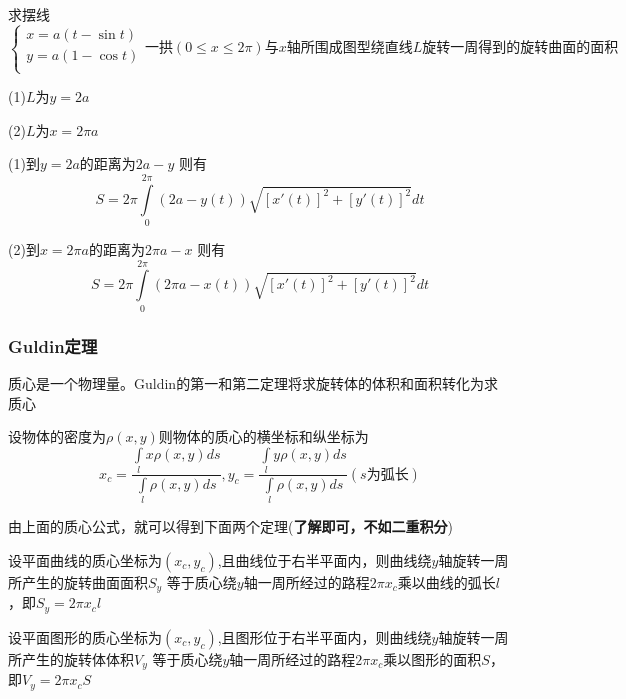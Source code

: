 \documentclass[lang=cn,10pt]{elegantbook}
\begin{document}
\begin{example}
	求摆线$\begin{cases}
		x=a\left( t-\sin t \right)\\
		y=a\left( 1-\cos t \right)\\
	\end{cases}\text{一拱}\left( 0\le x\le 2\pi \right) \text{与}x\text{轴所围成图型绕直线}L\text{旋转一周得到的旋转曲面的面积}$
	
	(1)$L$为$y=2a$
	
	(2)$L$为$x=2\pi a$
	
\end{example}
\begin{solution}
	
	(1)到$y=2a$的距离为$2a-y$
	则有
	\begin{equation*}
		S=2\pi \int\limits_0^{2\pi}{\left( 2a-y\left( t \right) \right) \sqrt{\left[ x\prime\left( t \right) \right] ^2+\left[ y\prime\left( t \right) \right] ^2}dt}
	\end{equation*}
	
	(2)到$x=2\pi a$的距离为$2\pi a-x$
	则有
	\begin{equation*}
		S=2\pi \int\limits_0^{2\pi}{\left( 2\pi a-x\left( t \right) \right) \sqrt{\left[ x\prime\left( t \right) \right] ^2+\left[ y\prime\left( t \right) \right] ^2}dt}
	\end{equation*}
\end{solution}
\subsubsection{Guldin定理}
质心是一个物理量。Guldin的第一和第二定理将求旋转体的体积和面积转化为求质心
\begin{proposition}[质心公式]
	设物体的密度为$\rho(x,y)$则物体的质心的横坐标和纵坐标为
	\begin{equation*}
		x_c=\frac{\int\limits_l{x\rho \left( x,y \right) ds}}{\int\limits_l{\rho \left( x,y \right) ds}},y_c=\frac{\int\limits_l{y\rho \left( x,y \right) ds}}{\int\limits_l{\rho \left( x,y \right) ds}}\left( s\text{为弧长} \right) 
	\end{equation*}
\end{proposition}
由上面的质心公式，就可以得到下面两个定理(\textbf{了解即可，不如二重积分})
\begin{proposition}[Guldin第一定理]
	设平面曲线的质心坐标为$(x_{c},y_{c})$,且曲线位于右半平面内，则曲线绕$y$轴旋转一周所产生的旋转曲面面积$S_{y}$ 等于质心绕$y $轴一周所经过的路程$2\pi x_{c}$乘以曲线的弧长$l$，即$S_{y}=2\pi x_{c}l$       
\end{proposition}
\begin{proposition}[Guldin第二定理]
	设平面图形的质心坐标为$(x_{c},y_{c})$,且图形位于右半平面内，则曲线绕$y$轴旋转一周所产生的旋转体体积$V_{y}$ 等于质心绕$y $轴一周所经过的路程$2\pi x_{c}$乘以图形的面积$S$，即$V_{y}=2\pi x_{c}S$
\end{proposition}
\end{document}
